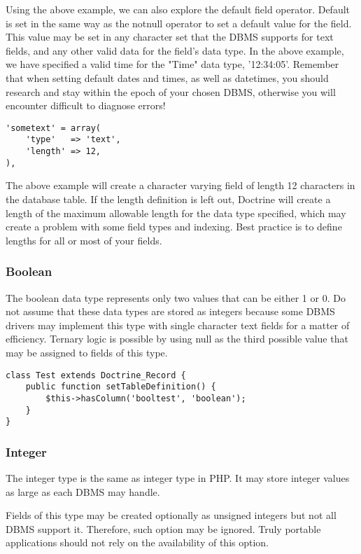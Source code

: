 \documentclass[11pt,a4paper]{report}
\begin{document}
Using the above example, we can also explore the default field operator. Default is set in the same way as the notnull operator to set a default value for the field. This value may be set in any character set that the DBMS supports for text fields, and any other valid data for the field's data type. In the above example, we have specified a valid time for the "Time" data type, '12:34:05'. Remember that when setting default dates and times, as well as datetimes, you should research and stay within the epoch of your chosen DBMS, otherwise you will encounter difficult to diagnose errors!

\begin{verbatim}
'sometext' = array(
    'type'   => 'text',
    'length' => 12,
),
\end{verbatim}

The above example will create a character varying field of length 12 characters in the database table. If the length definition is left out, Doctrine will create a length of the maximum allowable length for the data type specified, which may create a problem with some field types and indexing. Best practice is to define lengths for all or most of your fields.

\subsubsection{Boolean}
The boolean data type represents only two values that can be either 1 or 0. Do not assume that these data types are stored as integers because some DBMS drivers may implement this type with single character text fields for a matter of efficiency. Ternary logic is possible by using null as the third possible value that may be assigned to fields of this type.

\begin{verbatim}
class Test extends Doctrine_Record {
    public function setTableDefinition() {
        $this->hasColumn('booltest', 'boolean');
    }
}
\end{verbatim}

\subsubsection{Integer}
The integer type is the same as integer type in PHP. It may store integer values as large as each DBMS may handle.

Fields of this type may be created optionally as unsigned integers but not all DBMS support it. Therefore, such option may be ignored. Truly portable applications should not rely on the availability of this option.
\end{document}
